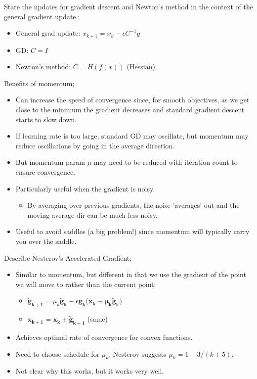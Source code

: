 \documentclass{article}
\begin{document}
State the updates for gradient descent and Newton's method in the context of the general gradient update.; \begin{itemize} \item General grad update: $x_{k+1}=x_k-\epsilon C^{-1}g$ \item GD: $C=I$ \item Newton's method: $C=H(f(x))$ (Hessian) \end{itemize}

Benefits of momentum; \begin{itemize} \item Can increase the speed of convergence since, for smooth objectives, as we get close to the minimum the gradient decreases and standard gradient descent starts to slow down.  \item If learning rate is too large, standard GD may oscillate, but momentum may reduce oscillations by going in the average direction.  \item But momentum param $\mu$ may need to be reduced with iteration count to ensure convergence.  \item Particularly useful when the gradient is noisy.  \begin{itemize} \item By averaging over previous gradients, the noise 'averages' out and the moving average dir can be much less noisy.  \end{itemize} \item Useful to avoid saddles (a big problem!) since momentum will typically carry you over the saddle.  \end{itemize}

Describe Nesterov's Accelerated Gradient; \begin{itemize} \item Similar to momentum, but different in that we use the gradient of the point we will move to rather than the current point: \begin{itemize} \item $\mathbf{\tilde{g}_{k+1}}=\mu_k\mathbf{\tilde{g}_k}-\epsilon \mathbf{g_k(x_k+\mu_k\tilde{g}_k})$ \item $\mathbf{x_{k+1}=x_k+\tilde{g}_{k+1}}$ (same) \end{itemize} \item Achieves optimal rate of convergence for convex functions.  \item Need to choose schedule for $\mu_k$. Nesterov suggests $\mu_k = 1 - 3/(k+5)$.  \item Not clear why this works, but it works very well.  \end{itemize}
\end{document}
